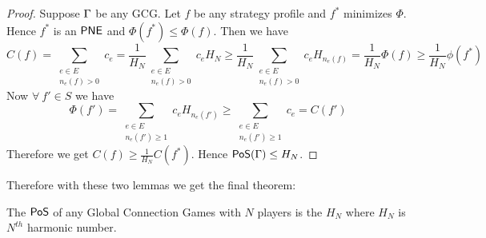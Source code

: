 \begin{proof}
	Suppose $\Gamma$ be any GCG. Let $f$ be any strategy profile and $f^*$ minimizes $\Phi$. Hence $f^*$ is an $\operatorname{\mathsf{PNE}}$ and $\Phi(f^*)\leq \Phi(f)$. Then we have $$C(f)=\sum\limits_{\substack{e\in E\\ n_e(f)>0}}c_e=\frac1{H_N}\sum\limits_{\substack{e\in E\\ n_e(f)>0}}c_eH_N\geq \frac1{H_N}\sum\limits_{\substack{e\in E\\ n_e(f)>0}}c_eH_{n_e(f)}=\frac1{H_N}\Phi(f)\geq \frac1{H_N}\phi(f^*)$$Now  $\forall \ f'\in S$ we have $$\Phi(f')=\sum\limits_{\substack{e\in E\\ n_e(f')\geq 1}}c_eH_{n_e(f')}\geq \sum\limits_{\substack{e\in E\\ n_e(f')\geq 1}}c_e=C(f')$$Therefore we get $C(f)\geq \frac1{H_N}C(f^*)$. Hence $\operatorname{\mathsf{PoS}}(\Gamma)\leq H_N$.
\end{proof}


Therefore with these two lemmas we get the final theorem:
\begin{Theorem}{}{}
	The $\operatorname{\mathsf{PoS}}$ of any Global Connection Games with $N$ players is the  $H_N$ where $H_N$ is $N^{th}$ harmonic number.
\end{Theorem}
